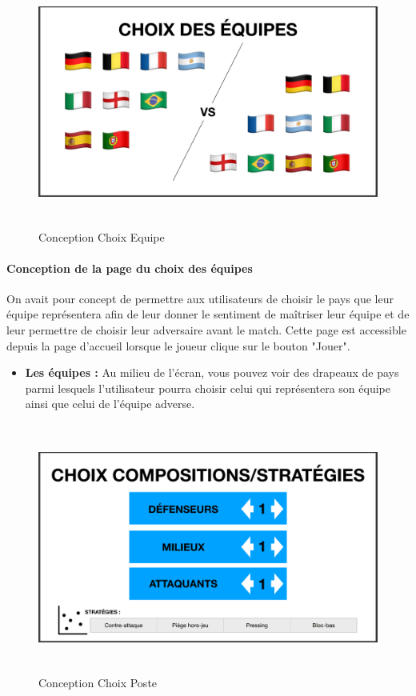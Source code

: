 \newpage

\begin{figure}[h]
\centering
\includegraphics[width=12.82cm, height=8.2cm]{images/ConceptIHM2.png}
\caption{Conception Choix Equipe}
\label{fig:choixEquipe}
\end{figure}

\paragraph{Conception de la page du choix des équipes}
    On avait pour concept de permettre aux utilisateurs de choisir le pays que leur équipe représentera afin de leur donner le sentiment de maîtriser leur équipe et de leur permettre de choisir leur adversaire avant le match. Cette page est accessible depuis la page d'accueil lorsque le joueur clique sur le bouton "Jouer".

\vspace{15pt}
    
\begin{itemize}
    \item \textbf{Les équipes :} 
        Au milieu de l'écran, vous pouvez voir des drapeaux de pays parmi lesquels l'utilisateur pourra choisir celui qui représentera son équipe ainsi que celui de l'équipe adverse.
        
    \vspace{15pt}
\end{itemize}

\begin{figure}[h]
\centering
\includegraphics[width=12.82cm, height=8.2cm]{images/ConceptIHM3.png}
\caption{Conception Choix Poste}
\label{fig:choixPoste}
\end{figure}

